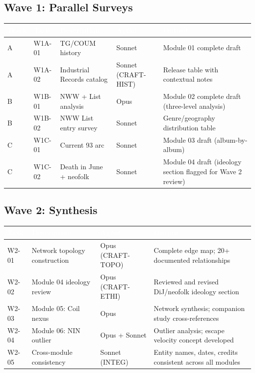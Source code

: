 \documentclass[11pt,letterpaper]{article}
\newcommand{\tableheader}[1]{\textbf{\sffamily\textcolor{white}{#1}}}
\begin{document}
\subsection{Wave 1: Parallel Surveys}

\begin{center}
\begin{tabularx}{\textwidth}{L{1.5cm}L{1.5cm}L{3cm}L{2cm}X}
\toprule
{}
\tableheader{Track} & \tableheader{Task} & \tableheader{Description} & \tableheader{Agent} & \tableheader{Output} \\
\midrule
A & W1A-01 & TG/COUM history & Sonnet & Module 01 complete draft \\
A & W1A-02 & Industrial Records catalog & Sonnet (CRAFT-HIST) & Release table with contextual notes \\
B & W1B-01 & NWW + List analysis & Opus & Module 02 complete draft (three-level analysis) \\
B & W1B-02 & NWW List entry survey & Sonnet & Genre/geography distribution table \\
C & W1C-01 & Current 93 arc & Sonnet & Module 03 draft (album-by-album) \\
C & W1C-02 & Death in June + neofolk & Sonnet & Module 04 draft (ideology section flagged for Wave 2 review) \\
\bottomrule
\end{tabularx}
\end{center}

\subsection{Wave 2: Synthesis}

\begin{center}
\begin{tabularx}{\textwidth}{L{1.5cm}L{3.5cm}L{2.5cm}X}
\toprule
{}
\tableheader{Task} & \tableheader{Description} & \tableheader{Agent} & \tableheader{Output} \\
\midrule
W2-01 & Network topology construction & Opus (CRAFT-TOPO) & Complete edge map; 20+ documented relationships \\
W2-02 & Module 04 ideology review & Opus (CRAFT-ETHI) & Reviewed and revised DiJ/neofolk ideology section \\
W2-03 & Module 05: Coil nexus & Opus & Network synthesis; companion study cross-references \\
W2-04 & Module 06: NIN outlier & Opus + Sonnet & Outlier analysis; escape velocity concept developed \\
W2-05 & Cross-module consistency & Sonnet (INTEG) & Entity names, dates, credits consistent across all modules \\
\bottomrule
\end{tabularx}
\end{center}
\end{document}
